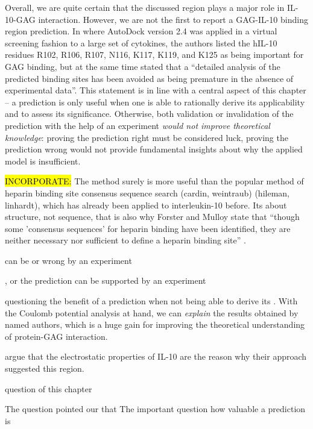Overall, we are quite certain that the discussed region plays a major role in
IL-10-GAG interaction. However, we are not the first to report a GAG-IL-10
binding region prediction. In \cite{mulloy_forster_2008_4helixcytokines} where
AutoDock version 2.4 \cite{autodock24} was applied in a virtual screening
fashion to a large set of cytokines, the authors listed the hIL-10 residues
R102, R106, R107, N116, K117, K119, and K125 as being important for GAG binding,
but at the same time stated that a \enquote{detailed analysis of the predicted
binding sites has been avoided as being premature in the absence of experimental
data}. This statement is in line with a central aspect of this chapter -- a
prediction is only useful when one is able to rationally derive its
applicability and to assess its significance. Otherwise, both validation or
invalidation of the prediction with the help of an experiment \textit{would not
improve theoretical knowledge}: proving the prediction right must be considered
luck, proving the prediction wrong would not provide fundamental insights about
why the applied model is insufficient.


\hl{INCORPORATE:} The method surely is more useful than the popular method of
heparin binding site consensus sequence search (cardin, weintraub) (hileman,
linhardt), which has already been applied to interleukin-10 before. Its about
structure, not sequence, that is also why Forster and Mulloy state that
\enquote{though some 'consensus sequences' for heparin binding have been
identified, they are neither necessary nor sufficient to define a heparin
binding site} \cite{hp_binding_sites_mulloy_2006}.





 can be  or wrong by an
experiment

, or the prediction can be supported by
an experiment

questioning the benefit of a prediction when not being able to
derive its . With the Coulomb
potential analysis at hand, we can \textit{explain} the results obtained by
named authors, which is a huge gain for improving the theoretical understanding
of protein-GAG interaction.


argue that the electrostatic properties of IL-10 are the reason why their approach suggested
this region.





question of this chapter


The question
pointed our that The important
question how valuable a prediction is




